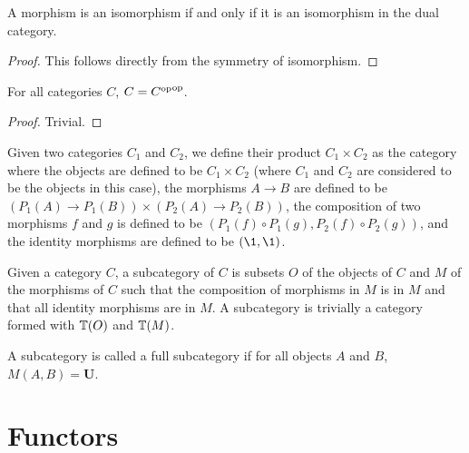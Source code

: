 \documentclass[../math.tex]{subfiles}
\begin{document}
\begin{theorem}
    A morphism is an isomorphism if and only if it is an isomorphism in the dual
    category.
\end{theorem}
\begin{proof}
    This follows directly from the symmetry of isomorphism.
\end{proof}

\begin{theorem}
    For all categories $C$, $C = {C^{\mathrm{op}}}^{\mathrm{op}}$.
\end{theorem}
\begin{proof}
    Trivial.
\end{proof}

\begin{definition}
    Given two categories $C_1$ and $C_2$, we define their product $C_1 \times
    C_2$ as the category where the objects are defined to be $C_1 \times C_2$
    (where $C_1$ and $C_2$ are considered to be the objects in this case), the
    morphisms $A \to B$ are defined to be $(P_1(A) \to P_1(B)) \times (P_2(A)
    \to P_2(B))$, the composition of two morphisms $f$ and $g$ is defined to be
    $(P_1(f) \circ P_1(g), P_2(f) \circ P_2(g))$, and the identity morphisms are
    defined to be $(\1, \1)$.
\end{definition}

\begin{definition}
    Given a category $C$, a subcategory of $C$ is subsets $O$ of the objects of
    $C$ and $M$ of the morphisms of $C$ such that the composition of morphisms
    in $M$ is in $M$ and that all identity morphisms are in $M$.  A subcategory
    is trivially a category formed with $\mathbb{T}(O)$ and $\mathbb{T}(M)$.
\end{definition}

\begin{definition}
    A subcategory is called a full subcategory if for all objects $A$ and $B$,
    $M(A, B) = \mathbf U$.
\end{definition}

\section{Functors}
\end{document}
